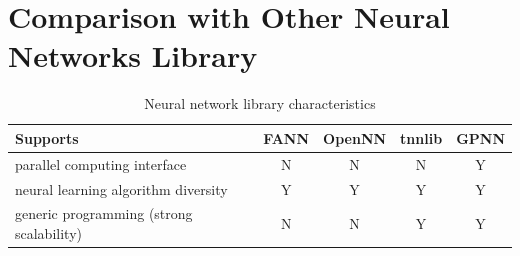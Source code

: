 \documentclass[procedia]{easychair}
\begin{document}
\appendix


\section{Comparison with Other Neural Networks Library}
\label{appendix:comparison}



\begin{table}[htp]
    \centering
    \caption{Neural network library characteristics}
    \begin{tabular}{ >{\centering}m{3cm} c c c c }
        \hline \hline
        Supports & FANN & OpenNN & tnnlib & GPNN \\
        \hline
        parallel computing interface & N & N & N & Y \\
        \hline 
        neural learning algorithm diversity & Y & Y & Y & Y \\
        \hline
        generic programming (strong scalability) & N & N & Y & Y \\
        \hline \hline
    \end{tabular}
    \label{table:library_compare}
\end{table}




\end{document}

